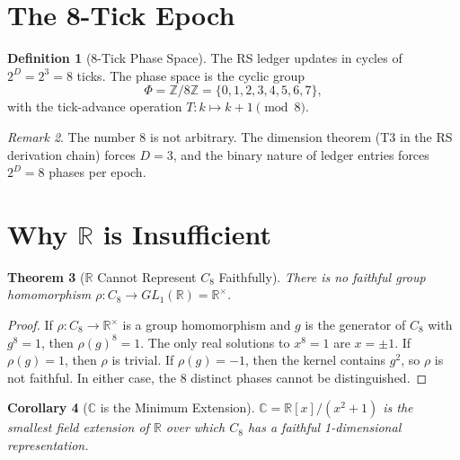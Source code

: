 \documentclass[12pt,a4paper]{article}
\newtheorem{theorem}{Theorem}[section]
\newtheorem{corollary}[theorem]{Corollary}
\theoremstyle{definition}
\newtheorem{definition}[theorem]{Definition}
\theoremstyle{remark}
\newtheorem{remark}[theorem]{Remark}
\begin{document}
\section{The 8-Tick Epoch}
\label{sec:epoch}

\begin{definition}[8-Tick Phase Space]
\label{def:phases}
The RS ledger updates in cycles of
$2^D = 2^3 = 8$ ticks.  The phase space is the cyclic group
\begin{equation}
  \Phi = \mathbb{Z}/8\mathbb{Z} = \{0, 1, 2, 3, 4, 5, 6, 7\},
\end{equation}
with the tick-advance operation $T\colon k \mapsto k + 1
\pmod{8}$.
\end{definition}

\begin{remark}
The number 8 is not arbitrary.  The dimension theorem (T3 in
the RS derivation chain) forces $D = 3$, and the binary nature
of ledger entries forces $2^D = 8$ phases per epoch.
\end{remark}

\section{Why $\mathbb{R}$ is Insufficient}
\label{sec:real}

\begin{theorem}[$\mathbb{R}$ Cannot Represent $C_8$ Faithfully]
\label{thm:real-fail}
There is no faithful group homomorphism
$\rho\colon C_8 \to GL_1(\mathbb{R}) = \mathbb{R}^\times$.
\end{theorem}

\begin{proof}
If $\rho\colon C_8 \to \mathbb{R}^\times$ is a group
homomorphism and $g$ is the generator of $C_8$ with
$g^8 = 1$, then $\rho(g)^8 = 1$.  The only real solutions
to $x^8 = 1$ are $x = \pm 1$.  If $\rho(g) = 1$, then
$\rho$ is trivial.  If $\rho(g) = -1$, then the kernel
contains $g^2$, so $\rho$ is not faithful.  In either case,
the 8 distinct phases cannot be distinguished.
\end{proof}

\begin{corollary}[$\mathbb{C}$ is the Minimum Extension]
\label{cor:cmin}
$\mathbb{C} = \mathbb{R}[x]/(x^2 + 1)$ is the smallest
field extension of $\mathbb{R}$ over which $C_8$ has a
faithful 1-dimensional representation.
\end{corollary}
\end{document}
